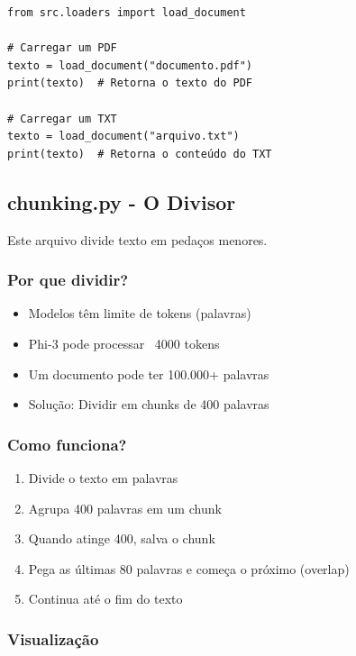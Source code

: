 \documentclass[12pt,a4paper]{article}
\begin{document}
\begin{lstlisting}
from src.loaders import load_document

# Carregar um PDF
texto = load_document("documento.pdf")
print(texto)  # Retorna o texto do PDF

# Carregar um TXT
texto = load_document("arquivo.txt")
print(texto)  # Retorna o conteúdo do TXT
\end{lstlisting}

\subsection{chunking.py - O Divisor}

Este arquivo divide texto em pedaços menores.

\subsubsection{Por que dividir?}

\begin{itemize}
    \item Modelos têm limite de tokens (palavras)
    \item Phi-3 pode processar ~4000 tokens
    \item Um documento pode ter 100.000+ palavras
    \item Solução: Dividir em chunks de 400 palavras
\end{itemize}

\subsubsection{Como funciona?}

\begin{enumerate}
    \item Divide o texto em palavras
    \item Agrupa 400 palavras em um chunk
    \item Quando atinge 400, salva o chunk
    \item Pega as últimas 80 palavras e começa o próximo (overlap)
    \item Continua até o fim do texto
\end{enumerate}

\subsubsection{Visualização}
\end{document}
